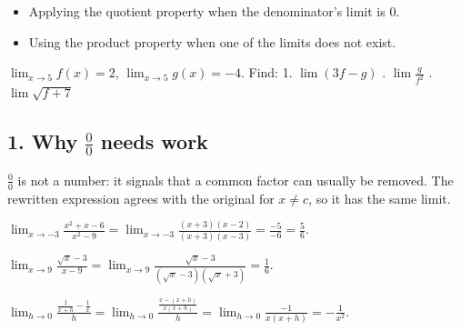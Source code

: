 \begin{mistakes}
\begin{itemize}
\item Applying the quotient property when the denominator's limit is $0$.
\item Using the product property when one of the limits does not exist.
\end{itemize}
\end{mistakes}

\begin{quickcheck}
$\lim_{x\to5}f(x)=2$, $\lim_{x\to5}g(x)=-4$. Find: 1. $\lim(3f-g)$ . $\lim\frac{g}{f^2}$ . $\lim\sqrt{f+7}$
\end{quickcheck}


\subsection*{1. Why $\frac00$ needs work}
$\frac00$ is not a number: it signals that a common factor can usually be removed. The rewritten expression agrees with the original for $x\neq c$, so it has the same limit.

\begin{example}
$\displaystyle\lim_{x\to-3}\frac{x^2+x-6}{x^2-9}=\lim_{x\to-3}\frac{(x+3)(x-2)}{(x+3)(x-3)}=\frac{-5}{-6}=\frac56.$
\end{example}

\begin{example}
$\displaystyle\lim_{x\to9}\frac{\sqrt x-3}{x-9}=\lim_{x\to9}\frac{\sqrt x-3}{(\sqrt x-3)(\sqrt x+3)}=\frac16.$
\end{example}

\begin{example}
$\displaystyle\lim_{h\to0}\frac{\frac{1}{x+h}-\frac1x}{h}=\lim_{h\to0}\frac{\frac{x-(x+h)}{x(x+h)}}{h}=\lim_{h\to0}\frac{-1}{x(x+h)}=-\frac{1}{x^2}.$
\end{example}

